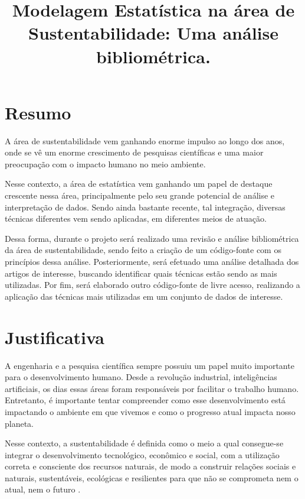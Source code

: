 \documentclass{article}[12pt]
\title{\textbf{Modelagem Estatística na área de Sustentabilidade: Uma análise bibliométrica.}}
\date{}
\author{}
\begin{document}
\maketitle

\section{Resumo}

A área de sustentabilidade vem ganhando enorme impulso ao longo dos anos, onde se vê um enorme
crescimento de pesquisas científicas e uma maior preocupação com o impacto humano no meio ambiente.
\par

Nesse contexto, a área de estatística vem ganhando um papel de destaque crescente nessa área,
principalmente pelo seu grande potencial de análise e interpretação de dados. Sendo ainda bastante
recente, tal integração, diversas técnicas diferentes vem sendo aplicadas, em diferentes meios de
atuação.  \par

Dessa forma, durante o projeto será realizado uma revisão e análise bibliométrica da área de
sustentabilidade, sendo feito a criação de um código-fonte com os princípios dessa análise.
Posteriormente, será efetuado uma análise detalhada dos artigos de interesse, buscando identificar
quais técnicas estão sendo as mais utilizadas. Por fim, será elaborado outro código-fonte de livre
acesso, realizando a aplicação das técnicas mais utilizadas em um conjunto de dados de interesse.
\par

\section{Justificativa}

A engenharia e a pesquisa científica sempre possuiu um papel muito importante para o desenvolvimento
humano. Desde a revolução industrial, %
inteligências artificiais, os dias essas áreas foram responsáveis por facilitar o trabalho humano.
Entretanto, é importante tentar compreender como esse desenvolvimento está impactando o ambiente em
que vivemos e como o progresso atual impacta nosso planeta. \par

Nesse contexto, a sustentabilidade é definida como o meio a qual consegue-se integrar o
desenvolvimento tecnológico, econômico e social, com a utilização correta e consciente dos recursos
naturais, de modo a construir relações sociais e naturais, sustentáveis, ecológicas e resilientes
para que não se comprometa nem o atual, nem o futuro \cite{UCLA_2021}.   
\end{document}
